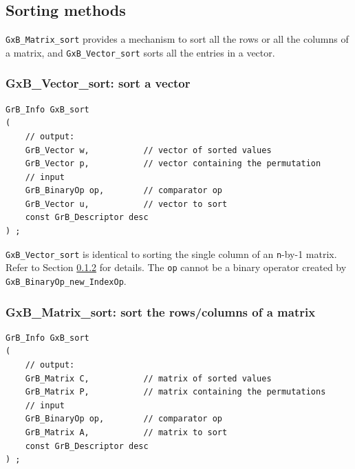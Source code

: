 

\newpage
\subsection{Sorting methods}
\label{sorting_methods}

\verb'GxB_Matrix_sort' provides a mechanism to sort all the rows or
all the columns of a matrix, and \verb'GxB_Vector_sort' sorts all the
entries in a vector.

\subsubsection{{\sf GxB\_Vector\_sort:} sort a vector}
\label{vector_sort}

\begin{mdframed}[userdefinedwidth=6in]
{\footnotesize
\begin{verbatim}
GrB_Info GxB_sort
(
    // output:
    GrB_Vector w,           // vector of sorted values
    GrB_Vector p,           // vector containing the permutation
    // input
    GrB_BinaryOp op,        // comparator op
    GrB_Vector u,           // vector to sort
    const GrB_Descriptor desc
) ;
\end{verbatim}
} \end{mdframed}

\verb'GxB_Vector_sort' is identical to sorting the single column of an
\verb'n'-by-1 matrix.
Refer to Section \ref{matrix_sort} for details.
%
The \verb'op' cannot be a binary operator
created by \verb'GxB_BinaryOp_new_IndexOp'.

\subsubsection{{\sf GxB\_Matrix\_sort:} sort the rows/columns of a matrix}
\label{matrix_sort}

\begin{mdframed}[userdefinedwidth=6in]
{\footnotesize
\begin{verbatim}
GrB_Info GxB_sort
(
    // output:
    GrB_Matrix C,           // matrix of sorted values
    GrB_Matrix P,           // matrix containing the permutations
    // input
    GrB_BinaryOp op,        // comparator op
    GrB_Matrix A,           // matrix to sort
    const GrB_Descriptor desc
) ;
\end{verbatim}
} \end{mdframed}

